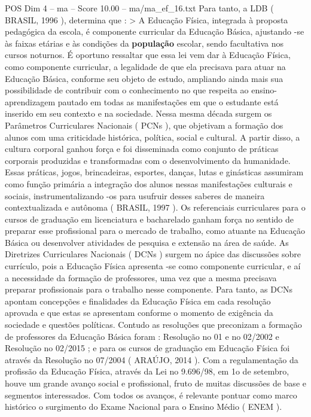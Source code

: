 \begin{textsample}{POS Dim 4 – ma – Score 10.00 – ma/ma\_ef\_16.txt}
Para tanto, a LDB ( BRASIL, 1996 ), determina que : > A Educação Física, integrada à proposta pedagógica da escola, é componente curricular da Educação Básica, ajustando -se às faixas etárias e às condições da \textbf{população} escolar, sendo facultativa nos cursos noturnos.
É oportuno ressaltar que essa lei vem dar à Educação Física, como componente curricular, a legalidade de que ela precisava para atuar na Educação Básica, conforme seu objeto de estudo, ampliando ainda mais sua possibilidade de contribuir com o conhecimento no que respeita ao ensino-aprendizagem pautado em todas as manifestações em que o estudante está inserido em seu contexto e na sociedade.
Nessa mesma década surgem os Parâmetros Curriculares Nacionais ( PCNs ), que objetivam a formação dos alunos com uma criticidade histórica, política, social e cultural.
A partir disso, a cultura corporal ganhou força e foi disseminada como conjunto de práticas corporais produzidas e transformadas com o desenvolvimento da humanidade.
Essas práticas, jogos, brincadeiras, esportes, danças, lutas e ginásticas assumiram como função primária a integração dos alunos nessas manifestações culturais e sociais, instrumentalizando -os para usufruir desses saberes de maneira contextualizada e autônoma ( BRASIL, 1997 ).
Os referenciais curriculares para o cursos de graduação em licenciatura e bacharelado ganham força no sentido de preparar esse profissional para o mercado de trabalho, como atuante na Educação Básica ou desenvolver atividades de pesquisa e extensão na área de saúde.
As Diretrizes Curriculares Nacionais ( DCNs ) surgem no ápice das discussões sobre currículo, pois a Educação Física apresenta -se como componente curricular, e aí a necessidade da formação de professores, uma vez que a mesma precisava preparar profissionais para o trabalho nesse componente.
Para tanto, as DCNs apontam concepções e finalidades da Educação Física em cada resolução aprovada e que estas se apresentam conforme o momento de exigência da sociedade e questões políticas.
Contudo as resoluções que preconizam a formação de professores da Educação Básica foram : Resolução no 01 e no 02/2002 e Resolução no 02/2015 ; e para os cursos de graduação em Educação Física foi através da Resolução no 07/2004 ( ARAÚJO, 2014 ).
Com a regulamentação da profissão da Educação Física, através da Lei no 9.696/98, em 1o de setembro, houve um grande avanço social e profissional, fruto de muitas discussões de base e segmentos interessados.
Com todos os avanços, é relevante pontuar como marco histórico o surgimento do Exame Nacional para o Ensino Médio ( ENEM ).

\end{textsample}
